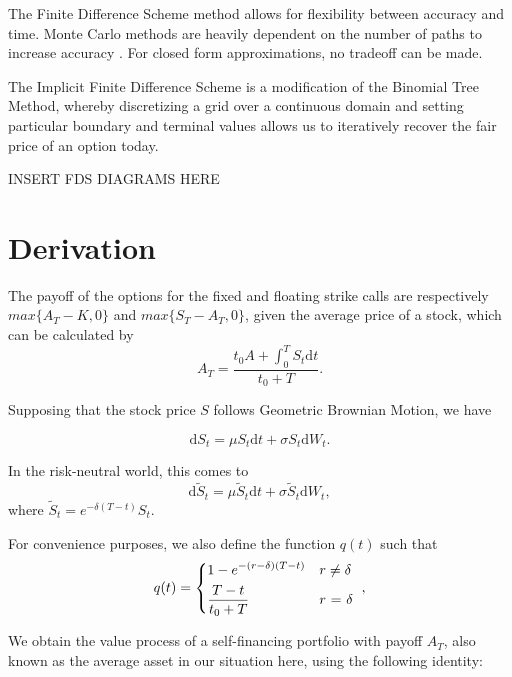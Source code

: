 \documentclass{article}
\begin{document}
The Finite Difference Scheme method allows for flexibility between accuracy and time. Monte Carlo methods are heavily dependent on the number of paths to increase accuracy \cite{montecarlo}. For closed form approximations, no tradeoff can be made.

The Implicit Finite Difference Scheme is a modification of the Binomial Tree Method, whereby discretizing a grid over a continuous domain and setting particular boundary and terminal values allows us to iteratively recover the fair price of an option today.

INSERT FDS DIAGRAMS HERE

\section{Derivation}

The payoff of the options for the fixed and floating strike calls are respectively \(max\{A_T - K, 0\}\) and \(max\{S_T - A_T, 0\}\), given the average price of a stock, which can be calculated by
\begin{equation}
  A_T = \frac{t_0A + \int_0^T S_t \mathrm{d}t}{t_0 + T}.
\end{equation}

Supposing that the stock price \(S\) follows Geometric Brownian Motion, we have

\begin{equation}
  \mathrm{d}S_t = \mu S_t \mathrm{d}t + \sigma S_t \mathrm{d}W_t.
\end{equation}

In the risk-neutral world, this comes to
\begin{equation}
  \mathrm{d}\tilde{S}_t = \mu \tilde{S}_t \mathrm{d}t + \sigma \tilde{S}_t \mathrm{d}W_t,
\end{equation}
where \(\tilde{S}_t = e^{-\delta(T-t)}S_t\).

For convenience purposes, we also define the function \(q(t)\) such that
\begin{equation}
  q(t) =
  \begin{dcases*}
    1 - e^{-(r-\delta)(T-t)} & \(r \neq \delta\) \\
    \frac{T-t}{t_0 + T} & \(r\) = \(\delta\)
  \end{dcases*},
\end{equation}

We obtain the value process of a self-financing portfolio with payoff \(A_T\), also known as the average asset in our situation here, using the following identity:
\end{document}
